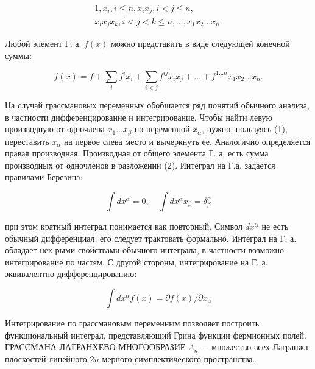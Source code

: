 \documentclass[10pt]{article}
\begin{document}
\[

\begin{gathered}

1, x_{i}, i \leqslant n, x_{i} x_{j}, i<j \leqslant n, \\

x_{i} x_{j} x_{k}, i<j<k \leqslant n, \ldots, x_{1} x_{2} \ldots x_{n} .

\end{gathered}

\]



Любой элемент Г. а. $f(x)$ можно представить в виде следующей конечной суммы:



\[

f(x)=f+\sum_{i} f^{i} x_{i}+\sum_{i<j} f^{i j} x_{i} x_{j}+\ldots+f^{1 \ldots n} x_{1} x_{2} \ldots x_{n} .

\]



На случай грассмановых переменных обобшается ряд понятий обычного анализа, в частности дифференцирование и интегрирование. Чтобы найти левую производную от одночлена $x_{1} \ldots x_{\beta}$ по переменной $x_{\alpha}$, нужно, пользуясь (1), переставить $x_{\alpha}$ на первое слева место и вычеркнуть ее. Аналогично определяется правая производная. Производная от общего элемента Г. а. есть сумма производных от одночленов в разложении (2). Интеграл на Г.а. задается правилами Березина:



\[

\int d x^{\alpha}=0, \quad \int d x^{\alpha} x_{\beta}=\delta_{\beta}^{\alpha}

\]



при этом кратный интеграл понимается как повторный. Символ $d x^{\alpha}$ не есть обычный дифференциал, его следует трактовать формально. Интеграл на Г. а. обладает нек-рыми свойствами обычного интеграла, в частности возможно интегрирование по частям. С другой стороны, интегрирование на Г. а. эквивалентно дифференцированию:



\[

\int d x^{\alpha} f(x)=\partial f(x) / \partial x_{\alpha}

\]



Интегрирование по грассмановым переменным позволяет построить функциональный интеграл, представляющий Грина функции фермионных полей. ГРАССМАНА ЛАГРАНХЕВО МНОГООБРАЗИЕ $\Lambda_{n}-$ множество всех Лагранжа плоскостей линейного $2 n$-мерного симплектического пространства.
\end{document}

